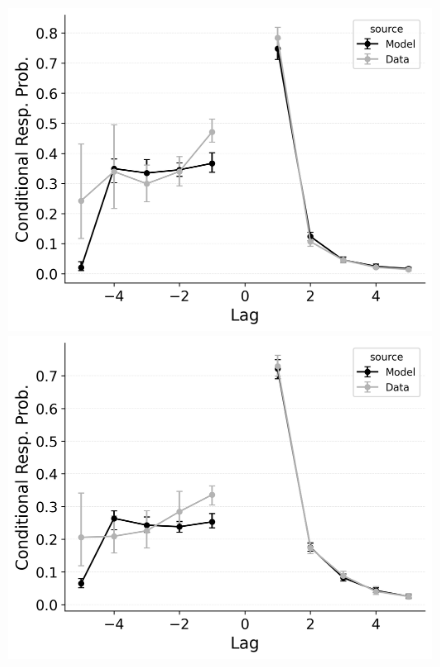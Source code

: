 \documentclass[
  man,
  floatsintext,
  longtable,
  nolmodern,
  notxfonts,
  notimes,
  draftfirst,
  colorlinks=true,linkcolor=blue,citecolor=blue,urlcolor=blue]{apa7}
\begin{document}
\begin{figure}
\begin{minipage}{0.33\linewidth}
\includegraphics{figures/bw_Gordon2021_CRU_with_Pre-Expt_and_Primacy_Confusable_Fitting_crp_LL6.png}\end{minipage}%
%
\begin{minipage}{0.33\linewidth}
\includegraphics{figures/bw_Gordon2021_CRU_with_Pre-Expt_and_Primacy_Confusable_Fitting_crp_LL7.png}\end{minipage}%
\newline
\begin{minipage}{0.33\linewidth}

\end{minipage}
\end{figure}
\end{document}
